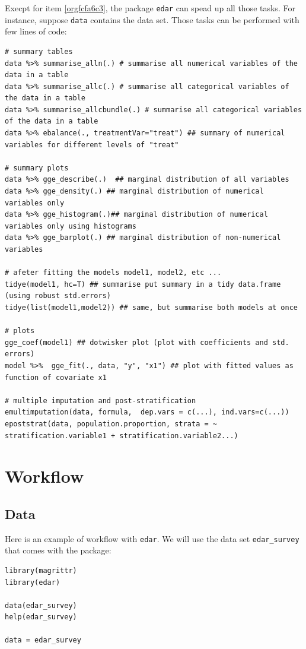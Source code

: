 \documentclass[a4paper]{article}
\begin{document}
Execpt for item \ref{orgfcfa6c3}, the package \texttt{edar} can spead up all those tasks. For instance, suppose \texttt{data} contains the data set. Those tasks can be performed with few lines of code:

\lstset{numbers=left,language=r,label= ,caption= ,captionpos=b}
\begin{lstlisting}
# summary tables
data %>% summarise_alln(.) # summarise all numerical variables of the data in a table
data %>% summarise_allc(.) # summarise all categorical variables of the data in a table 
data %>% summarise_allcbundle(.) # summarise all categorical variables of the data in a table
data %>% ebalance(., treatmentVar="treat") ## summary of numerical variables for different levels of "treat"

# summary plots
data %>% gge_describe(.)  ## marginal distribution of all variables
data %>% gge_density(.) ## marginal distribution of numerical variables only
data %>% gge_histogram(.)## marginal distribution of numerical variables only using histograms
data %>% gge_barplot(.) ## marginal distribution of non-numerical variables

# afeter fitting the models model1, model2, etc ...
tidye(model1, hc=T) ## summarise put summary in a tidy data.frame (using robust std.errors)
tidye(list(model1,model2)) ## same, but summarise both models at once

# plots
gge_coef(model1) ## dotwisker plot (plot with coefficients and std. errors)
model %>%  gge_fit(., data, "y", "x1") ## plot with fitted values as function of covariate x1

# multiple imputation and post-stratification
emultimputation(data, formula,  dep.vars = c(...), ind.vars=c(...)) 
epoststrat(data, population.proportion, strata = ~ stratification.variable1 + stratification.variable2...) 
\end{lstlisting}

\section{Workflow}
\label{sec:org5478a81}
\subsection{Data}
\label{sec:org941c5e3}
Here is an example of workflow with \texttt{edar}. We will use the data set \texttt{edar\_survey} that comes with the package:

\lstset{numbers=left,language=r,label=orgb6b50b5,caption= ,captionpos=b}
\begin{lstlisting}
library(magrittr)
library(edar)

data(edar_survey)
help(edar_survey)

data = edar_survey
\end{lstlisting}
\end{document}
